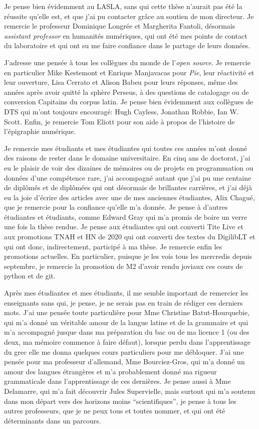 Je pense bien évidemment au LASLA, sans qui cette thèse n'aurait pas été la réussite qu'elle est, et que j'ai pu contacter grâce au soutien de mon directeur. Je remercie le professeur Dominique Longrée et 
Margherita Fantoli, désormais \textit{assistant professor} en humanités numériques, qui ont été mes points de contact du laboratoire et qui ont su me faire confiance dans le partage de leurs données.

J'adresse une pensée à tous les collègues du monde de l'\textit{open source}. Je remercie en particulier Mike Kestemont et Enrique Manjavacas pour \textit{Pie}, leur réactivité et leur ouverture, Lisa Cerrato et Alison Babeu pour leurs réponses, même des années après avoir quitté la sphère Perseus, à des questions de catalogage ou de conversion Capitains du corpus latin. Je pense bien évidemment aux collègues de DTS qui m'ont toujours encouragé: Hugh Cayless, Jonathan Robbie, Ian W. Scott. Enfin, je remercie Tom Eliott pour son aide à propos de l'histoire de l'épigraphie numérique. 

Je remercie mes étudiants et mes étudiantes qui toutes ces années m'ont donné des raisons de rester dans le domaine universitaire. En cinq ans de doctorat, j'ai eu le plaisir de voir des dizaines de mémoires ou de projets en programmation ou données d'une compétence rare, j'ai accompagné autant que j'ai pu une centaine de diplômés et de diplômées qui ont désormais de brillantes carrières, et j'ai déjà eu la joie d'écrire des articles avec une de mes anciennes étudiantes, Alix Chagué, que je remercie pour la confiance qu'elle m'a donnée. Je pense à d'autres étudiantes et étudiants, comme Edward Gray qui m'a promis de boire un verre une fois la thèse rendue. Je pense aux étudiantes qui ont converti Tite Live et aux promotions TNAH et HN de 2020 qui ont converti des textes du DigilibLT et qui ont donc, indirectement, participé à ma thèse. Je remercie enfin les promotions actuelles. En particulier, puisque je les vois tous les mercredis depuis septembre, je remercie la promotion de M2 d'avoir rendu joviaux ces cours de python et de git.

Après mes étudiantes et mes étudiants, il me semble important de remercier les enseignants sans qui, je pense, je ne serais pas en train de rédiger ces derniers mots. J'ai une pensée toute particulière pour Mme Christine Batut-Hourquebie, qui m'a donné un véritable amour de la langue latine et de la grammaire et qui m'a accompagné jusque dans ma préparation du bac ou de ma licence 1 (ou des deux, ma mémoire commence à faire défaut), lorsque perdu dans l'apprentissage du grec elle me donna quelques cours particuliers pour me débloquer. J'ai une pensée pour ma professeur d'allemand, Mme Bourciez-Gros, qui m'a donné un amour des langues étrangères et m'a probablement donné ma rigueur grammaticale dans l'apprentissage de ces dernières. Je pense aussi à Mme Delamarre, qui m'a fait découvrir Jules Supervielle, mais surtout qui m'a soutenu dans mon départ vers des horizons moins \enquote{scientifiques}, je pense à tous les autres professeurs, que je ne peux tous et toutes nommer, et qui ont été déterminants dans un parcours.

